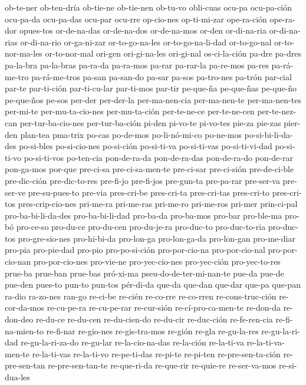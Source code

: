 {ob-te-ner ob-ten-dría ob-tie-ne ob-tie-nen ob-tu-vo obli-cuas ocu-pa ocu-pa-ción ocu-pa-da
ocu-pa-das ocu-par ocu-rre op-cio-nes op-ti-mi-zar ope-ra-ción ope-ra-dor opues-tos or-de-na-das
or-de-na-dos or-de-na-mos or-den or-di-na-ria or-di-na-rias or-di-na-rio or-ga-ni-zar
or-to-go-na-les or-to-go-na-li-dad or-to-go-nal or-to-nor-ma-les or-to-nor-mal ori-gen ori-gi-na-les
ori-gi-nal os-ci-la-ción pa-dre pa-dres pa-la-bra pa-la-bras pa-ra-da pa-ra-mos pa-rar pa-rar-la
pa-re-mos pa-res pa-rá-me-tro pa-rá-me-tros pa-san pa-san-do pa-sar pa-sos pa-tro-nes pa-trón
par-cial par-te par-ti-ción par-ti-cu-lar par-ti-mos par-tir pe-que-ña pe-que-ñas pe-que-ño
pe-que-ños pe-sos per-der per-der-la per-ma-nen-cia per-ma-nen-te per-ma-nen-tes per-mi-te
per-mu-ta-cio-nes per-mu-ta-ción per-te-ne-ce per-te-ne-cen per-te-nez-can per-tur-ba-cio-nes
per-tur-ba-ción pi-den pi-vo-te pi-vo-tes pie-za pie-zas pier-den plan-tea pma-trix po-cas po-de-mos
po-li-nó-mi-co po-ne-mos po-si-bi-li-da-des po-si-bles po-si-cio-nes po-si-ción po-si-ti-va
po-si-ti-vas po-si-ti-vi-dad po-si-ti-vo po-si-ti-vos po-ten-cia pon-de-ra-da pon-de-ra-das
pon-de-ra-do pon-de-rar pon-ga-mos por-que pre-ci-sa pre-ci-sa-men-te pre-ci-sar pre-ci-sión
pre-de-ci-ble pre-dic-ción pre-dic-to-res pre-fi-jo pre-fi-jos pre-gun-ta pre-pa-rar pre-ser-va
pre-ser-ve pre-su-pues-to pre-via pres-cri-be pres-cri-ta pres-cri-tas pres-cri-to pres-cri-tos
pres-crip-cio-nes pri-me-ra pri-me-ras pri-me-ro pri-me-ros pri-mer prin-ci-pal pro-ba-bi-li-da-des
pro-ba-bi-li-dad pro-ba-da pro-ba-mos pro-bar pro-ble-ma pro-bó pro-ce-so pro-du-ce pro-du-cen
pro-du-je-ra pro-duc-to pro-duc-to-ria pro-duc-tos pro-gre-sio-nes pro-hi-bi-da pro-lon-ga
pro-lon-ga-da pro-lon-gan pro-me-diar pro-pia pro-pie-dad pro-pio pro-po-si-ción pro-por-cio-na
pro-por-cio-nal pro-por-cio-nan pro-por-cio-nes pro-vie-ne pro-yec-cio-nes pro-yec-ción
pro-yec-to-res prue-ba prue-ban prue-bas pró-xi-ma pseu-do-de-ter-mi-nan-te pue-da pue-de pue-den
pues-to pun-to pun-tos pér-di-da que-da que-dan que-dar que-pa que-pan ra-dio ra-zo-nes ran-go
re-ci-be re-cién re-co-rre re-co-rren re-cons-truc-ción re-cor-da-mos re-cu-pe-ra re-cu-pe-rar
re-cur-sión re-cí-pro-ca-men-te re-don-da re-don-deo re-du-ce re-du-cen re-du-cien-do re-du-cir
re-duc-ción re-fe-ren-cia re-fi-na-mien-to re-fi-nar re-gio-nes re-gis-tra-mos re-gión re-gla
re-gu-la-res re-gu-la-ri-dad re-gu-la-ri-za-do re-gu-lar re-la-cio-na-das re-la-ción re-la-ti-va
re-la-ti-va-men-te re-la-ti-vas re-la-ti-vo re-pe-ti-das re-pi-te re-pi-ten re-pre-sen-ta-ción
re-pre-sen-tan re-pre-sen-tan-te re-que-ri-da re-que-rir re-quie-re re-ser-va-mos re-si-dua-les
}
